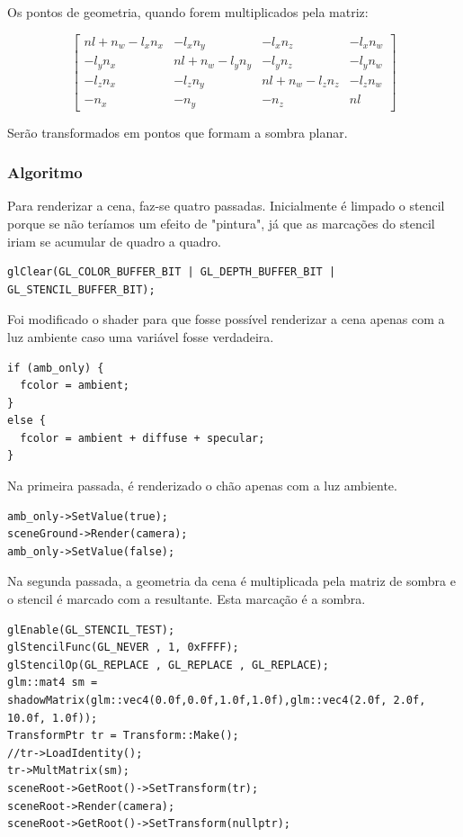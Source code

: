 \documentclass[11pt, a4paper]{article}
\begin{document}
Os pontos de geometria, quando forem multiplicados pela matriz:

\[
\begin{bmatrix}
  nl + n_{w} - l_{x}n_{x} & -l_{x}n_{y} & -l_{x}n_{z} & -l_{x}n_{w} \\
  -l_{y}n_{x} & nl + n_{w} - l_{y}n_{y} & -l_{y}n_{z} & -l_{y}n_{w} \\
  -l_{z}n_{x} & -l_{z}n_{y} & nl + n_{w} - l_{z}n_{z} & -l_{z}n_{w} \\
  -n_{x} & -n_{y} & -n_{z} & nl
\end{bmatrix}
\]

Serão transformados em pontos que formam a sombra planar.

\subsubsection{Algoritmo}
Para renderizar a cena, faz-se quatro passadas. Inicialmente é limpado o stencil 
porque se não teríamos um efeito de "pintura", já que as marcações do stencil 
iriam se acumular de quadro a quadro.

\begin{verbatim}
glClear(GL_COLOR_BUFFER_BIT | GL_DEPTH_BUFFER_BIT | GL_STENCIL_BUFFER_BIT);
\end{verbatim}

Foi modificado o shader para que fosse possível renderizar a cena apenas com a 
luz ambiente caso uma variável fosse verdadeira.

\begin{verbatim}
if (amb_only) {
  fcolor = ambient;
}
else {
  fcolor = ambient + diffuse + specular;
}
\end{verbatim}

Na primeira passada, é renderizado o chão apenas com a luz ambiente.

\begin{verbatim}
amb_only->SetValue(true);
sceneGround->Render(camera);
amb_only->SetValue(false);
\end{verbatim}


Na segunda passada, a geometria da cena é multiplicada pela matriz de sombra e o 
stencil é marcado com a resultante. Esta marcação é a sombra.

\begin{verbatim}
glEnable(GL_STENCIL_TEST);
glStencilFunc(GL_NEVER , 1, 0xFFFF);
glStencilOp(GL_REPLACE , GL_REPLACE , GL_REPLACE);
glm::mat4 sm = shadowMatrix(glm::vec4(0.0f,0.0f,1.0f,1.0f),glm::vec4(2.0f, 2.0f, 
10.0f, 1.0f));
TransformPtr tr = Transform::Make();
//tr->LoadIdentity();
tr->MultMatrix(sm);
sceneRoot->GetRoot()->SetTransform(tr);
sceneRoot->Render(camera);
sceneRoot->GetRoot()->SetTransform(nullptr);
\end{verbatim}
\end{document}
